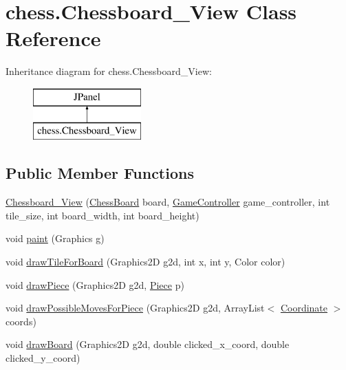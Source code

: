 \hypertarget{classchess_1_1_chessboard___view}{}\section{chess.\+Chessboard\+\_\+\+View Class Reference}
\label{classchess_1_1_chessboard___view}
Inheritance diagram for chess.\+Chessboard\+\_\+\+View\+:\begin{figure}[H]
\begin{center}
\leavevmode
\includegraphics[height=2.000000cm]{classchess_1_1_chessboard___view}
\end{center}
\end{figure}
\subsection*{Public Member Functions}
\begin{DoxyCompactItemize}
\item 
\hyperlink{classchess_1_1_chessboard___view_a603a5829216277fc2987cae53e7cfff0}{Chessboard\+\_\+\+View} (\hyperlink{classchessboard_1_1_chess_board}{Chess\+Board} board, \hyperlink{classchess_1_1_game_controller}{Game\+Controller} game\+\_\+controller, int tile\+\_\+size, int board\+\_\+width, int board\+\_\+height)
\item 
void \hyperlink{classchess_1_1_chessboard___view_a5e73e6ae6724334ae54ac3b5e9969f1f}{paint} (Graphics g)
\item 
void \hyperlink{classchess_1_1_chessboard___view_a0d2cefaddf8ae8a0b52f71347e4017fa}{draw\+Tile\+For\+Board} (Graphics2\+D g2d, int x, int y, Color color)
\item 
void \hyperlink{classchess_1_1_chessboard___view_a1aacffbd1910181a835308ae40afbb0d}{draw\+Piece} (Graphics2\+D g2d, \hyperlink{classpiece_1_1_piece}{Piece} p)
\item 
void \hyperlink{classchess_1_1_chessboard___view_a0e84f18e7cfa470edac2a16e54f7e6eb}{draw\+Possible\+Moves\+For\+Piece} (Graphics2\+D g2d, Array\+List$<$ \hyperlink{classpiece_1_1_coordinate}{Coordinate} $>$ coords)
\item 
void \hyperlink{classchess_1_1_chessboard___view_a43e435d12ccea60a92d3b9d4638d48c3}{draw\+Board} (Graphics2\+D g2d, double clicked\+\_\+x\+\_\+coord, double clicked\+\_\+y\+\_\+coord)
\end{DoxyCompactItemize}
